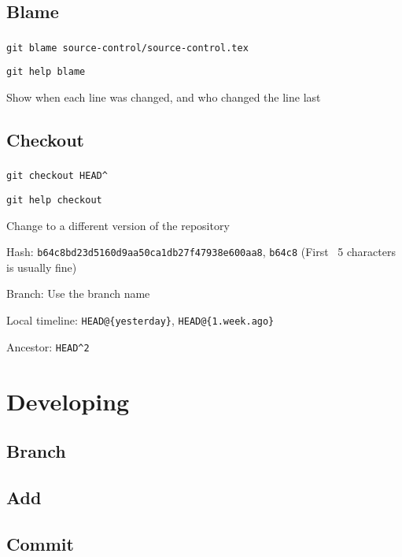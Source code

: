 \documentclass{beamer}
\begin{document}
\subsection{Blame}
\begin{frame}
\frametitle{\insertsection}
\framesubtitle{\insertsubsection}

\texttt{git blame source-control/source-control.tex}

\texttt{git help blame}

Show when each line was changed, and who changed the line last
\end{frame}

\subsection{Checkout}
\begin{frame}
\frametitle{\insertsection}
\framesubtitle{\insertsubsection}
\texttt{git checkout HEAD\^{}}

\texttt{git help checkout}

Change to a different version of the repository

Hash: \texttt{b64c8bd23d5160d9aa50ca1db27f47938e600aa8}, \texttt{b64c8} (First ~5 characters is usually fine)

Branch: Use the branch name

Local timeline: \texttt{HEAD@\{yesterday\}}, \texttt{HEAD@\{1.week.ago\}}

Ancestor: \texttt{HEAD\^{}2}
\end{frame}

\section{Developing}
\subsection{Branch}
\begin{frame}
\frametitle{\insertsection}
\framesubtitle{\insertsubsection}
\end{frame}

\subsection{Add}
\begin{frame}
\frametitle{\insertsection}
\framesubtitle{\insertsubsection}
\end{frame}

\subsection{Commit}
\begin{frame}
\frametitle{\insertsection}
\framesubtitle{\insertsubsection}
\end{frame}
\end{document}
